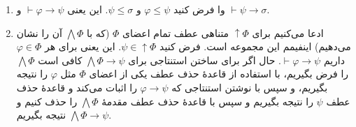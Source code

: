 \begin{ans}
    \begin{enumerate}[label=(\alph*)]
        \item 
        وا
        فرض کنید
        $\varphi\leq\psi$
        و
        $\psi\leq\sigma$.
        این یعنی
        $\vdash\varphi\to\psi$
        و
        $\vdash\psi\to\sigma$.
        \item ادعا می‌کنیم برای
        $\uparrow\Phi$
        متناهی عطف تمام اعضای
        $\Phi$
        (که با
        $\bigwedge\Phi$
        آن را نشان می‌دهیم)
        اینفیمم این مجموعه است.
        فرض کنید
        $\psi\in\uparrow\Phi$.
        این یعنی برای هر
        $\varphi\in\Phi$
        داریم
        $\vdash\varphi\to\psi$.
        حال اگر برای ساختن استنتاجی برای
        $\bigwedge\Phi\to\psi$
        کافی است
        $\bigwedge\Phi$
        را فرض بگیریم، با استفاده از قاعدهٔ حذف عطف یکی از اعضای
        $\Phi$
        مثل
        $\varphi$
        را نتیجه بگیریم، و سپس با نوشتن استنتاجی که
        $\varphi\to\psi$
        را اثبات می‌کند و قاعدهٔ حذف عطف
        $\psi$
        را نتیجه بگیریم و سپس با قاعدهٔ حذف عطف مقدمهٔ
        $\bigwedge\Phi$
        را حذف کنیم و نتیجه بگیریم
        $\bigwedge\Phi\to\psi$.
    \end{enumerate}
\end{ans}